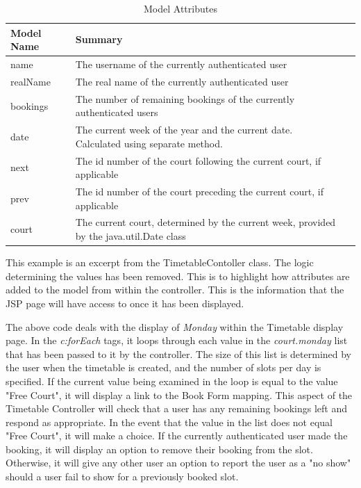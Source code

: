 \begin{table}[H]
\begin{center}
\caption{Model Attributes}
    \begin{tabular}{ | l | l | p{5cm} |}
    \hline
    Model Name & Summary \\ \hline
    name & The username of the currently authenticated user  \\ \hline
    realName & The real name of the currently authenticated user\\ \hline
	bookings & The number of remaining bookings of the currently authenticated users\\ \hline
	date & The current week of the year and the current date. Calculated using separate method.\\ \hline
	next & The id number of the court following the current court, if applicable\\ \hline
    prev & The id number of the court preceding the current court, if applicable\\ \hline
	court & The current court, determined by the current week, provided by the java.util.Date class \\
    \hline
    \end{tabular}
\end{center}

\label{fig:ttmodelattributes}
\end{table}


This example is an excerpt from the TimetableContoller class. The logic determining the values has been removed. This is to highlight how attributes are added to the model from within the controller. This is the information that the JSP page will have access to once it has been displayed.

The above code deals with the display of \textit{Monday} within the Timetable display page. In the \textit{c:forEach} tags, it loops through each value in the \textit{court.monday} list that has been passed to it by the controller. The size of this list is determined by the user when the timetable is created, and the number of slots per day is specified. If the current value being examined in the loop is equal to the value "Free Court", it will display a link to the Book Form mapping. This aspect of the Timetable Controller will check that a user has any remaining bookings left and respond as appropriate. In the event that the value in the list does not equal "Free Court", it will make a choice. If the currently authenticated user made the booking, it will display an option to remove their booking from the slot. Otherwise, it will give any other user an option to report the user as a "no show" should a user fail to show for a previously booked slot. \newline

